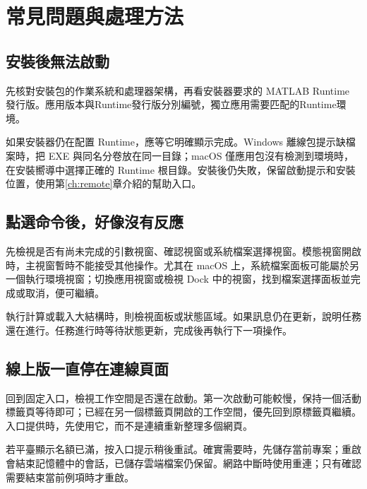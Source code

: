 \chapter{常見問題與處理方法}\label{ch:troubleshooting}


\section{安裝後無法啟動}

先核對安裝包的作業系統和處理器架構，再看安裝器要求的 MATLAB\regmark{} Runtime 發行版。應用版本與Runtime發行版分別編號，獨立應用需要匹配的Runtime環境。

如果安裝器仍在配置 Runtime，應等它明確顯示完成。Windows 離線包提示缺檔案時，把 EXE 與同名分卷放在同一目錄；macOS 僅應用包沒有檢測到環境時，在安裝嚮導中選擇正確的 Runtime 根目錄。安裝後仍失敗，保留啟動提示和安裝位置，使用第\ref{ch:remote}章介紹的幫助入口。

\section{點選命令後，好像沒有反應}

先檢視是否有尚未完成的引數視窗、確認視窗或系統檔案選擇視窗。模態視窗開啟時，主視窗暫時不能接受其他操作。尤其在 macOS 上，系統檔案面板可能屬於另一個執行環境視窗；切換應用視窗或檢視 Dock 中的視窗，找到檔案選擇面板並完成或取消，便可繼續。

執行計算或載入大結構時，則檢視面板或狀態區域。如果訊息仍在更新，說明任務還在進行。任務進行時等待狀態更新，完成後再執行下一項操作。

\section{線上版一直停在連線頁面}

回到固定入口，檢視工作空間是否還在啟動。第一次啟動可能較慢，保持一個活動標籤頁等待即可；已經在另一個標籤頁開啟的工作空間，優先回到原標籤頁繼續。入口提供時，先使用它，而不是連續重新整理多個網頁。

若平臺顯示名額已滿，按入口提示稍後重試。確實需要時，先儲存當前專案；重啟會結束記憶體中的會話，已儲存雲端檔案仍保留。網路中斷時使用重連；只有確認需要結束當前例項時才重啟。

